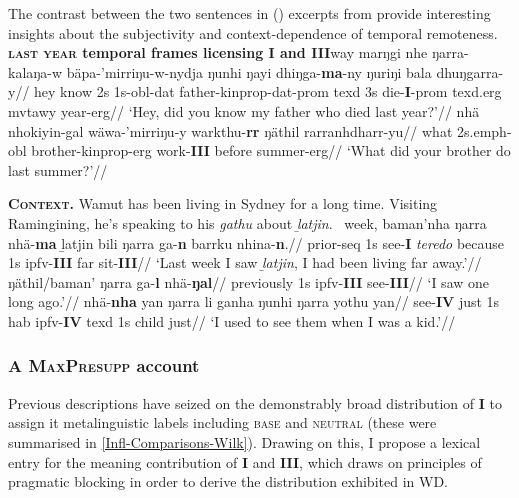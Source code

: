 \documentclass[11pt,dvipsnames]{report}
\begin{document}
The contrast between the two sentences in () excerpts from \citet[343]{Wilkinson1991} provide interesting insights about the subjectivity and context-dependence of temporal remoteness.
\pex{}\textbf{\textsc{last year} temporal frames licensing \textbf{I} and \textbf{III}}\a\begingl\gla way marŋgi nhe ŋarra-kalaŋa-w bäpa-'mirriŋu-w-nydja ŋunhi ŋayi dhiŋga-\textbf{ma}-ny ŋuriŋi bala dhuŋgarra-y//
\glb hey know 2s 1s-\gls{obl}-\gls{dat} father-\gls{kinprop}-\gls{dat}-\gls{prom} \gls{texd} 3s die-\textbf{I}-\gls{prom} \gls{texd}.\gls{erg} \gls{mvtawy} year-\gls{erg}//
\glft`Hey, did you know my father who died last year?'//\endgl
\a\begingl\gla nhä nhokiyin-gal wäwa-'mirriŋu-y warkthu-\textbf{rr} ŋäthil rarranhdharr-yu//
\glb what 2s.\gls{emph}-\gls{obl} brother-\gls{kinprop}-\gls{erg} work-\textbf{III} before summer-\gls{erg}//
\glft`What did your brother do last summer?'//\endgl
\xe




\pex\textbf{\textsc{Context.}} Wamut has been living in Sydney for a long time. Visiting Ramingining, he's speaking to his \textit{gathu} about \textit{ḻatjin}.
\a\begingl\gla {}~week, baman'nha ŋarra nhä-\textbf{ma} ḻatjin bili ŋarra ga-\textbf{n} barrku nhina-\textbf{n}.//
\glb prior-\gls{seq} 1s see-\textbf{I} \textsl{teredo} because 1s \gls{ipfv}-\textbf{III} far sit-\textbf{III}//
\glft`Last week I saw \textit{ḻatjin}, I had been living far away.'//\endgl
\a\begingl\gla ŋäthil/baman' ŋarra ga-\textbf{l} nhä-\textbf{ŋal}//
\glb previously 1s \gls{ipfv}-\textbf{III} see-\textbf{III}//
\glft`I saw one long ago.'//\endgl
\a\begingl\gla nhä-\textbf{nha} yan ŋarra li ganha ŋunhi ŋarra yothu yan//
\glb see-\textbf{IV} just 1s \gls{hab} \gls{ipfv}-\textbf{IV} \gls{texd} 1s child just//
\glft`I used to see them when I was a kid.'\trailingcitation{[AW~20190422]}//\endgl\xe

\clearpage\subsubsection{A \textsc{MaxPresupp} account}

Previous descriptions have seized on the demonstrably broad distribution of \textbf{I} to assign it metalinguistic labels including \textsc{base} and \textsc{neutral} (these were summarised in \ref{Infl-Comparisons-Wilk}). Drawing on this, I propose a lexical entry for the meaning contribution of \textbf{I} and \textbf{III}, which draws on principles of pragmatic blocking in order to derive the distribution exhibited in WD.
\end{document}
